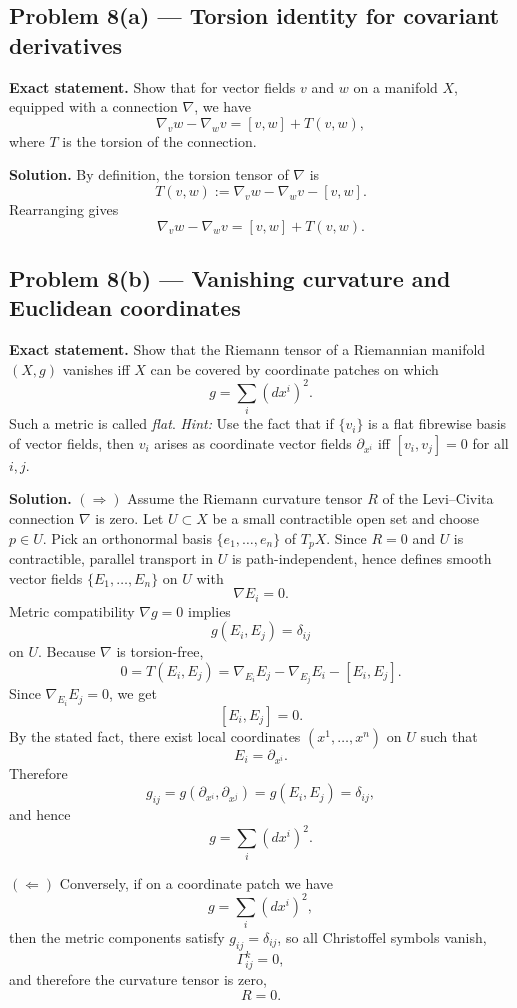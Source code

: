 \documentclass[12pt,a4paper]{article}
\theoremstyle{plain}
\theoremstyle{definition}      %
\begin{document}
\subsection*{Problem 8(a) — Torsion identity for covariant derivatives}

\textbf{Exact statement.}
Show that for vector fields $v$ and $w$ on a manifold $X$, equipped with a connection $\nabla$, we have
\[
\nabla_v w-\nabla_w v=[v,w]+T(v,w),
\]
where $T$ is the torsion of the connection.

\textbf{Solution.}
By definition, the torsion tensor of $\nabla$ is
\[
T(v,w):=\nabla_v w-\nabla_w v-[v,w].
\]
Rearranging gives
\[
\nabla_v w-\nabla_w v=[v,w]+T(v,w).
\]

\subsection*{Problem 8(b) — Vanishing curvature and Euclidean coordinates}

\textbf{Exact statement.}
Show that the Riemann tensor of a Riemannian manifold $(X,g)$ vanishes iff $X$ can be covered by coordinate patches on which
\[
g=\sum_i (dx^i)^2.
\]
Such a metric is called \emph{flat}.
\textit{Hint:} Use the fact that if $\{v_i\}$ is a flat fibrewise basis of vector fields, then $v_i$ arises as coordinate vector fields $\partial_{x^i}$ iff $[v_i,v_j]=0$ for all $i,j$.

\textbf{Solution.}
$(\Rightarrow)$ Assume the Riemann curvature tensor $R$ of the Levi--Civita connection $\nabla$ is zero.
Let $U\subset X$ be a small contractible open set and choose $p\in U$.
Pick an orthonormal basis $\{e_1,\dots,e_n\}$ of $T_pX$.
Since $R=0$ and $U$ is contractible, parallel transport in $U$ is path-independent, hence defines smooth vector fields
$\{E_1,\dots,E_n\}$ on $U$ with
\[
\nabla E_i=0.
\]
Metric compatibility $\nabla g=0$ implies
\[
g(E_i,E_j)=\delta_{ij}
\]
on $U$.
Because $\nabla$ is torsion-free,
\[
0=T(E_i,E_j)=\nabla_{E_i}E_j-\nabla_{E_j}E_i-[E_i,E_j].
\]
Since $\nabla_{E_i}E_j=0$, we get
\[
[E_i,E_j]=0.
\]
By the stated fact, there exist local coordinates $(x^1,\dots,x^n)$ on $U$ such that
\[
E_i=\partial_{x^i}.
\]
Therefore
\[
g_{ij}=g(\partial_{x^i},\partial_{x^j})=g(E_i,E_j)=\delta_{ij},
\]
and hence
\[
g=\sum_i (dx^i)^2.
\]

$(\Leftarrow)$ Conversely, if on a coordinate patch we have
\[
g=\sum_i (dx^i)^2,
\]
then the metric components satisfy $g_{ij}=\delta_{ij}$, so all Christoffel symbols vanish,
\[
\Gamma^k_{ij}=0,
\]
and therefore the curvature tensor is zero,
\[
R=0.
\]
\end{document}
